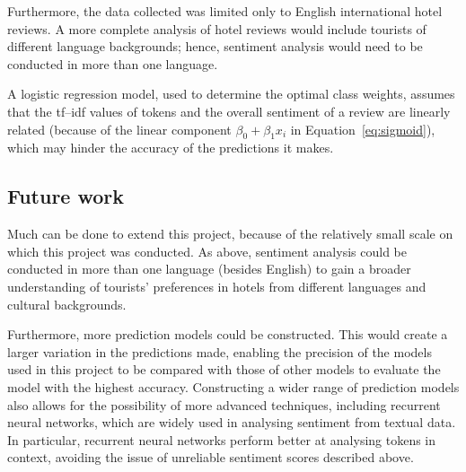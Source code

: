\documentclass[11pt, a4paper]{pancake-article}
\begin{document}
Furthermore, the data collected was limited only to English
international hotel reviews.
A more complete analysis of hotel reviews would include tourists of
different language
backgrounds; hence, sentiment analysis would need to be conducted in
more than one language.

A logistic regression model, used to determine the optimal class
weights, assumes that the tf--idf values of tokens
and the overall sentiment of a review are linearly related (because
  of the linear component $\beta_0 + \beta_1x_i$
in Equation~\ref{eq:sigmoid}), which may hinder the accuracy of the
predictions it makes.

\subsection{Future work}

Much can be done to extend this project, because of the relatively
small scale on which this project
was conducted. As above, sentiment analysis could be conducted in
more than one language (besides English)
to gain a broader understanding of tourists' preferences in hotels
from different languages and cultural
backgrounds.

Furthermore, more prediction models could be constructed. This would
create a larger
variation in the predictions made, enabling the precision of the
models used in this project to be
compared with those of other models to evaluate the model with the
highest accuracy. Constructing a
wider range of prediction models also allows for the possibility of
more advanced techniques,
including recurrent neural networks, which are
widely used in analysing sentiment from textual data. In particular,
recurrent neural
networks perform better at analysing tokens in context, avoiding the issue
of unreliable sentiment scores described above.

\pagebreak
\printbibliography[heading=bibintoc]
\end{document}
